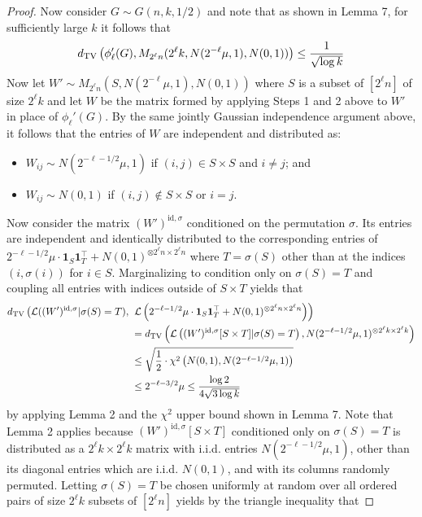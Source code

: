 \documentclass[11pt]{article}
\begin{document}
\begin{proof}
Now consider $G \sim G(n, k, 1/2)$ and note that as shown in Lemma 7, for sufficiently large $k$ it follows that
$$d_{\text{TV}}\left( \phi_\ell'(G), M_{2^{\ell} n}(2^{\ell} k, N(2^{-\ell}\mu, 1), N(0, 1)) \right) \le \frac{1}{\sqrt{\log k}}$$
Now let $W' \sim M_{2^{\ell} n}(S, N(2^{-\ell}\mu, 1), N(0, 1))$ where $S$ is a subset of $[2^\ell n]$ of size $2^\ell k$ and let $W$ be the matrix formed by applying Steps 1 and 2 above to $W'$ in place of $\phi_\ell'(G)$. By the same jointly Gaussian independence argument above, it follows that the entries of $W$ are independent and distributed as:
\begin{itemize}
\item $W_{ij} \sim N(2^{-\ell-1/2} \mu, 1)$ if $(i, j) \in S \times S$ and $i \neq j$; and
\item $W_{ij} \sim N(0, 1)$ if $(i, j) \not \in S \times S$ or $i = j$.
\end{itemize}
Now consider the matrix $(W')^{\text{id}, \sigma}$ conditioned on the permutation $\sigma$. Its entries are independent and identically distributed to the corresponding entries of $2^{-\ell-1/2} \mu \cdot \mathbf{1}_S \mathbf{1}_T^\top + N(0, 1)^{\otimes 2^\ell n \times 2^\ell n}$ where $T = \sigma(S)$ other than at the indices $(i, \sigma(i))$ for $i \in S$. Marginalizing to condition only on $\sigma(S) = T$ and coupling all entries with indices outside of $S \times T$ yields that
\begin{align*}
d_{\text{TV}}\left( \mathcal{L}((W')^{\text{id}, \sigma} | \sigma(S) = T), \right. &\left. \mathcal{L}\left( 2^{-\ell-1/2} \mu \cdot \mathbf{1}_S \mathbf{1}_T^\top + N(0, 1)^{\otimes 2^\ell n \times 2^\ell n} \right) \right) \\
&= d_{\text{TV}}\left( \mathcal{L}\left( (W')^{\text{id}, \sigma}[S \times T] | \sigma(S) = T \right), N(2^{-\ell-1/2} \mu, 1)^{\otimes 2^\ell k \times 2^\ell k} \right) \\
&\le \sqrt{\frac{1}{2} \cdot \chi^2\left( N(0, 1), N(2^{-\ell-1/2}\mu, 1) \right)} \\
&\le 2^{-\ell-3/2} \mu \le \frac{\log 2}{4 \sqrt{3 \log k}}
\end{align*}
by applying Lemma 2 and the $\chi^2$ upper bound shown in Lemma 7. Note that Lemma 2 applies because $(W')^{\text{id}, \sigma}[S \times T]$ conditioned only on $\sigma(S) = T$ is distributed as a $2^\ell k \times 2^\ell k$ matrix with i.i.d. entries $N(2^{-\ell-1/2} \mu, 1)$, other than its diagonal entries which are i.i.d. $N(0, 1)$, and with its columns randomly permuted. Letting $\sigma(S) = T$ be chosen uniformly at random over all ordered pairs of size $2^\ell k$ subsets of $[2^\ell n]$ yields by the triangle inequality that

\end{proof}
\end{document}

